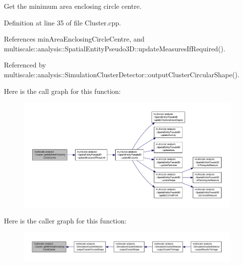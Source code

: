 Get the minimum area enclosing circle centre. 



Definition at line 35 of file Cluster.\-cpp.



References min\-Area\-Enclosing\-Circle\-Centre, and multiscale\-::analysis\-::\-Spatial\-Entity\-Pseudo3\-D\-::update\-Measures\-If\-Required().



Referenced by multiscale\-::analysis\-::\-Simulation\-Cluster\-Detector\-::output\-Cluster\-Circular\-Shape().



Here is the call graph for this function\-:
\nopagebreak
\begin{figure}[H]
\begin{center}
\leavevmode
\includegraphics[width=350pt]{classmultiscale_1_1analysis_1_1Cluster_a4d93f85faf929336818248e1fd604fb6_cgraph}
\end{center}
\end{figure}




Here is the caller graph for this function\-:
\nopagebreak
\begin{figure}[H]
\begin{center}
\leavevmode
\includegraphics[width=350pt]{classmultiscale_1_1analysis_1_1Cluster_a4d93f85faf929336818248e1fd604fb6_icgraph}
\end{center}
\end{figure}



